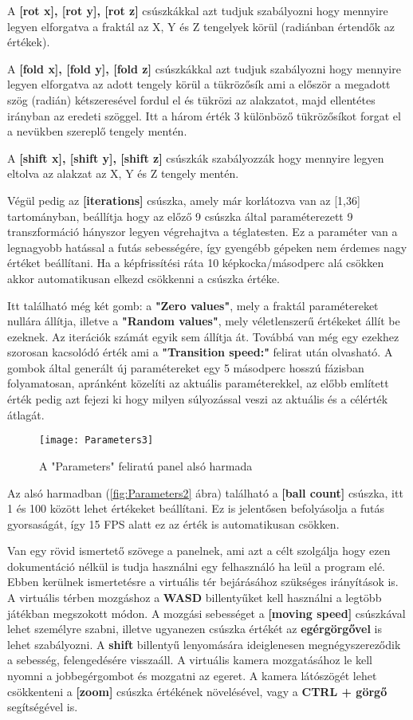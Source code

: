 A \textbf{[rot x], [rot y], [rot z]} csúszkákkal azt tudjuk szabályozni hogy mennyire legyen elforgatva a fraktál az X, Y és Z tengelyek körül (radiánban értendők az értékek). 

A \textbf{[fold x], [fold y], [fold z]} csúszkákkal azt tudjuk szabályozni hogy mennyire legyen elforgatva az adott tengely körül a tükrözősík  ami a először a megadott szög (radián) kétszeresével fordul el és tükrözi az alakzatot, majd ellentétes irányban az eredeti szöggel. Itt a három érték 3 különböző tükrözősíkot forgat el a nevükben szereplő tengely mentén. 

A \textbf{[shift x], [shift y], [shift z]} csúszkák szabályozzák hogy mennyire legyen eltolva az alakzat az X, Y és Z tengely mentén.

Végül pedig az \textbf{[iterations]} csúszka, amely már korlátozva van az [1,36] tartományban, beállítja hogy az előző 9 csúszka által paraméterezett 9 transzformáció hányszor legyen végrehajtva a téglatesten. Ez a paraméter van a legnagyobb hatással a futás sebességére, így gyengébb gépeken nem érdemes nagy értéket beállítani. Ha a képfrissítési ráta 10 képkocka/másodperc alá csökken akkor automatikusan elkezd csökkenni a csúszka értéke.

Itt található még két gomb: a \textbf{"Zero values"}, mely a fraktál paramétereket nullára állítja, illetve a \textbf{"Random values"}, mely véletlenszerű értékeket állít be ezeknek. Az iterációk számát egyik sem állítja át. Továbbá van még egy ezekhez szorosan kacsolódó érték ami a \textbf{"Transition speed:"} felirat után olvasható. A gombok által generált új paramétereket egy 5 másodperc hosszú fázisban folyamatosan, apránként közelíti az aktuális paraméterekkel, az előbb említett érték pedig azt fejezi ki hogy milyen súlyozással veszi az aktuális és a célérték átlagát.

\begin{figure}[H]
	\centering
	\texttt{[image: Parameters3]}
	\caption{A "Parameters" feliratú panel alsó harmada}
	\label{fig:Parameters3}
\end{figure}

Az alsó harmadban (\ref{fig:Parameters2} ábra) található a \textbf{[ball count]} csúszka, itt 1 és 100 között lehet értékeket beállítani. Ez is jelentősen befolyásolja a futás gyorsaságát, így 15 FPS alatt ez az érték is automatikusan csökken.

Van egy rövid ismertető szövege a panelnek, ami azt a célt szolgálja hogy ezen dokumentáció nélkül is tudja használni egy felhasználó ha leül a program elé. Ebben kerülnek ismertetésre a virtuális tér bejárásához szükséges irányítások is. A virtuális térben mozgáshoz a \textbf{WASD} billentyűket kell használni a legtöbb játékban megszokott módon. A mozgási sebességet a \textbf{[moving speed]} csúszkával lehet személyre szabni, illetve ugyanezen csúszka értékét az \textbf{egérgörgővel} is lehet szabályozni. A \textbf{shift} billentyű lenyomására ideiglenesen megnégyszereződik a sebesség, felengedésére visszaáll. A virtuális kamera mozgatásához le kell nyomni a jobbegérgombot és mozgatni az egeret. A kamera látószögét lehet csökkenteni a \textbf{[zoom]} csúszka értékének növelésével, vagy a \textbf{CTRL + görgő} segítségével is.

